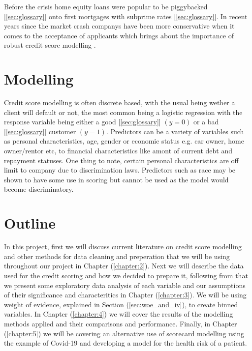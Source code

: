  Before the crisis home equity loans were popular to be piggybacked [\ref{sec:glossary}] onto first mortgages with subprime rates [\ref{sec:glossary}]. In recent years since the market crash companys have been more conservative when it comes to the acceptance of applicants which brings about the importance of robust credit score modelling \parencite{corelogic2016home}.

\section{Modelling}
Credit score modelling is often discrete based, with the usual being wether a client will default or not, the most common being a logistic regression with the response variable being either a good [\ref{sec:glossary}] $(y=0)$ or a bad [\ref{sec:glossary}] customer $(y=1)$. Predictors can be a variety of variables such as personal characteristics, age, gender or economic status e.g. car owner, home owner/rentor etc, to financial characteristics like amont of current debt and repayment statuses. One thing to note, certain personal characteristics are off limit to company due to discrimination laws. Predictors such as race may be shown to have some use in scoring but cannot be used as the model would become discriminatory.\\

\section{Outline}
In this project, first we will discuss current literature on credit score modelling and other methods for data cleaning and preperation that we will be using throughout our project in Chapter (\ref{chapter:2}). Next we will describe the data used for the credit scoring and how we decided to prepare it, following from that we present some exploratory data analysis of each variable and our assumptions of their significance and characteritics in Chapter (\ref{chapter:3}). We will be using weight of evidence, explained in Section (\ref{sec:woe_and_iv}), to create binned variables. In Chapter (\ref{chapter:4}) we will cover the results of the modelling methods applied and their comparisons and performance. Finally, in Chapter (\ref{chapter:5}) we will be covering an alternative use of scorecard modelling using the example of Covid-19 and developing a model for the health risk of a patient.